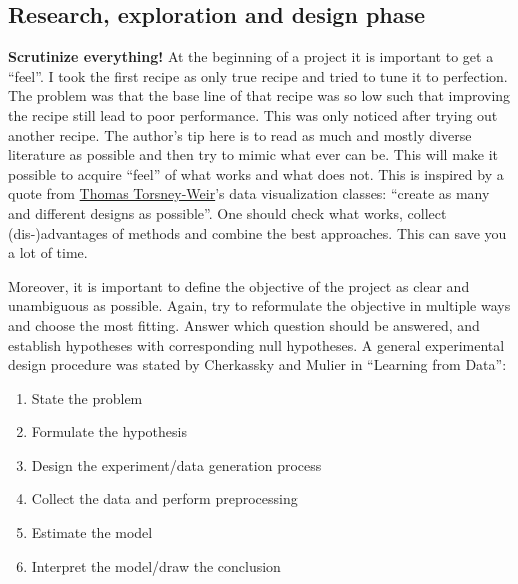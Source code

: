 \subsection{Research, exploration and design phase}
\label{sec:phase1}
\textbf{Scrutinize everything!} At the beginning of a project it is important 
to get a ``feel''. 
I took the first recipe as only true recipe and tried to tune it to perfection. 
The problem was that the base line of that recipe was so low such that 
improving the recipe still lead to poor performance.
This was only noticed after trying out another recipe. 
The author's tip here is to read as much and mostly diverse literature as possible and then try to mimic what ever can be. 
This will 
make it possible to acquire 
``feel'' of what works and what does not. 
This is inspired by a quote from \href{http://www.tomtorsneyweir.com/}{Thomas Torsney-Weir}'s 
data visualization classes: ``create as many and different designs as possible''.
One should check what works, collect (dis-)advantages of methods and combine the best approaches. 
This can save you a lot of time. 

Moreover, it is important to define the objective of the project as clear and unambiguous as possible. 
Again, try to reformulate the objective in multiple ways and choose the most fitting. 
Answer which question should be answered, and establish hypotheses with corresponding null hypotheses. 
A general experimental design procedure was stated by Cherkassky and Mulier in  ``Learning from Data''\cite{cherkassky1998learning}:
\begin{enumerate}
    \item {State the problem}
    \item {Formulate the hypothesis}
    \item {Design the experiment/data generation process}
    \item {Collect the data and perform preprocessing}
    \item {Estimate the model}
    \item {Interpret the model/draw the conclusion}
\end{enumerate}
